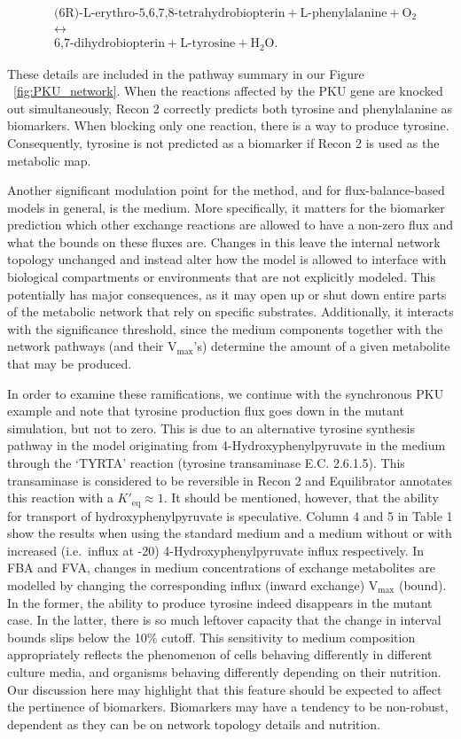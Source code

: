 \documentclass[10pt,a4paper,onecolumn]{article}
\begin{document}
\begin{align*}
&\text{(6R)-L-erythro-5,6,7,8-tetrahydrobiopterin} + \text{L-phenylalanine} + \text{O}_2 \\
&\leftrightarrow \\
&\text{6,7-dihydrobiopterin} + \text{L-tyrosine} + \text{H}_2\text{O}.
\end{align*}

These details are included in the pathway summary in our Figure
~\ref{fig:PKU_network}. When the reactions affected by the PKU gene are
knocked out simultaneously, Recon 2 correctly predicts both tyrosine and
phenylalanine as biomarkers. When blocking only one reaction, there is a
way to produce tyrosine. Consequently, tyrosine is not predicted as a
biomarker if Recon 2 is used as the metabolic map.

Another significant modulation point for the method, and for
flux-balance-based models in general, is the medium. More specifically,
it matters for the biomarker prediction which other exchange reactions
are allowed to have a non-zero flux and what the bounds on these fluxes
are. Changes in this leave the internal network topology unchanged and
instead alter how the model is allowed to interface with biological
compartments or environments that are not explicitly modeled. This
potentially has major consequences, as it may open up or shut down
entire parts of the metabolic network that rely on specific substrates.
Additionally, it interacts with the significance threshold, since the
medium components together with the network pathways (and their
V\(_{\text{max}}\)'s) determine the amount of a given metabolite that
may be produced.

In order to examine these ramifications, we continue with the
synchronous PKU example and note that tyrosine production flux goes down
in the mutant simulation, but not to zero. This is due to an alternative
tyrosine synthesis pathway in the model originating from
4-Hydroxyphenylpyruvate in the medium through the `TYRTA' reaction
(tyrosine transaminase E.C. 2.6.1.5). This transaminase is considered to
be reversible in Recon 2 and Equilibrator \autocite{Noor2012} annotates
this reaction with a \(K'_{\text{eq}} \approx 1\). It should be
mentioned, however, that the ability for transport of
hydroxyphenylpyruvate is speculative. Column 4 and 5 in Table 1 show the
results when using the standard medium and a medium without or with
increased (i.e.~influx at -20) 4-Hydroxyphenylpyruvate influx
respectively. In FBA and FVA, changes in medium concentrations of
exchange metabolites are modelled by changing the corresponding influx
(inward exchange) V\(_{\text{max}}\) (bound). In the former, the ability
to produce tyrosine indeed disappears in the mutant case. In the latter,
there is so much leftover capacity that the change in interval bounds
slips below the 10\% cutoff. This sensitivity to medium composition
appropriately reflects the phenomenon of cells behaving differently in
different culture media, and organisms behaving differently depending on
their nutrition. Our discussion here may highlight that this feature
should be expected to affect the pertinence of biomarkers. Biomarkers
may have a tendency to be non-robust, dependent as they can be on
network topology details and nutrition.
\end{document}
